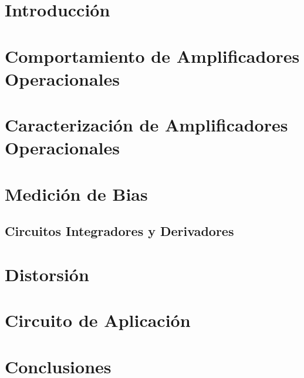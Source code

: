







\section{Introducción}


\section{Comportamiento de Amplificadores Operacionales}

	

\section{Caracterización de Amplificadores Operacionales}

	

\section{Medición de Bias}

	

\subsection{Circuitos Integradores y Derivadores}

	

\section{Distorsión}

	

\section{Circuito de Aplicación}

	

\section{Conclusiones}


